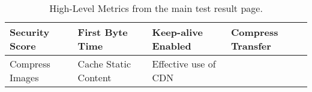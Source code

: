 \begin{table}[h]
	\small
	\centering
	\begin{tabular}{| l | l | l | l |}
	\hline
	Security Score & First Byte Time & Keep-alive Enabled & Compress Transfer \\
	\hline
	Compress Images & Cache Static Content & Effective use of CDN & \\	
	\hline
	\end{tabular}
	\medskip
	\caption{High-Level Metrics from the main test result page.}
	\label{table:wpt_metrics_categories}
\end{table}










